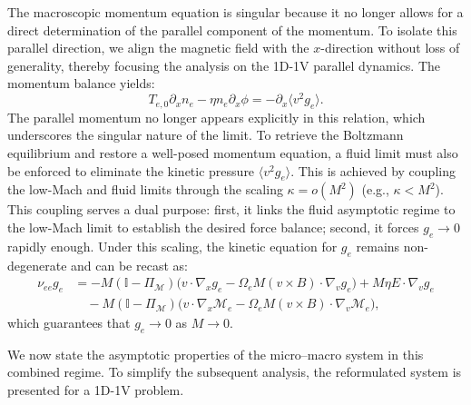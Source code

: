 \documentclass[pdflatex,final,10pt]{article}
\begin{document}
The macroscopic momentum equation is singular because it no longer allows for a direct determination of the parallel component of the momentum. To isolate this parallel direction, we align the magnetic field with the $x$-direction without loss of generality, thereby focusing the analysis on the 1D-1V parallel dynamics. The momentum balance yields:
\begin{equation}
    T_{e,0}\partial_{x}n_e - \eta n_e\partial_{x}\phi = -\partial_x \langle v^2 g_e \rangle.
\end{equation}
The parallel momentum no longer appears explicitly in this relation, which underscores the singular nature of the limit. To retrieve the Boltzmann equilibrium and restore a well-posed momentum equation, a fluid limit must also be enforced to eliminate the kinetic pressure $\langle v^2 g_e \rangle$. This is achieved by coupling the low-Mach and fluid limits through the scaling $\kappa = o(M^2)$ (e.g., $\kappa < M^2$). This coupling serves a dual purpose: first, it links the fluid asymptotic regime to the low-Mach limit to establish the desired force balance; second, it forces $g_e \to 0$ rapidly enough. Under this scaling, the kinetic equation for $g_e$ remains non-degenerate and can be recast as:
\begin{equation*}
\begin{split}
    \nu_{ee}g_e &= -M (\mathbb{I}-\Pi_{\mathcal{M}})\big(v\cdot\nabla_x g_e - \Omega_e M (v\times B)\cdot\nabla_v g_e\big) + M \eta E\cdot\nabla_v g_e \\
    &\quad - M (\mathbb{I}-\Pi_{\mathcal{M}})\big(v\cdot\nabla_x\mathcal{M}_e - \Omega_e M (v\times B)\cdot\nabla_v\mathcal{M}_e\big),
\end{split}
\end{equation*}
which guarantees that $g_e \to 0$ as $M \to 0$.

We now state the asymptotic properties of the micro--macro system in this combined regime. To simplify the subsequent analysis, the reformulated system is presented for a 1D-1V problem.
\end{document}
